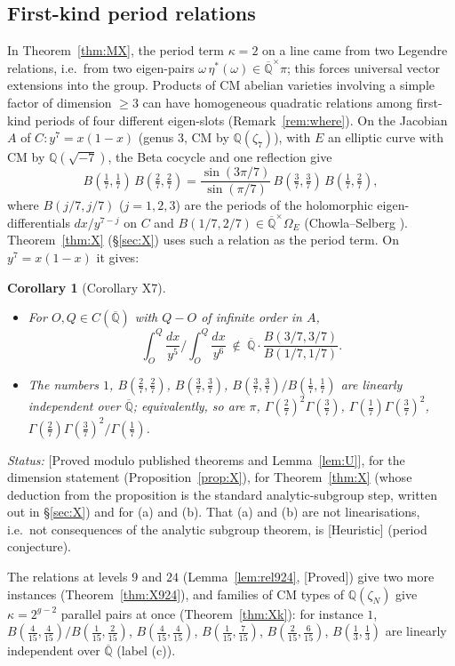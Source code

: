 \documentclass[11pt]{amsart}
\newtheorem{corollary}[theorem]{Corollary}
\theoremstyle{definition}
\newcommand{\Qb}{\overline{\mathbb{Q}}}
\newcommand{\Q}{\mathbb{Q}}
\newcommand{\lab}[1]{\textup{[#1]}}
\newcommand{\LabC}{\lab{Proved modulo published theorems and Lemma~\ref{lem:U}}}
\newcommand{\Status}{\noindent\emph{Status:} }
\begin{document}
\subsection*{First-kind period relations}
In Theorem~\ref{thm:MX}, the period term $\kappa=2$ on a line came from two Legendre relations, i.e.\ from two
eigen-pairs $\omega\,\eta^*(\omega)\in\Qb^\times\pi$; this forces universal vector extensions into the group. Products of
CM abelian varieties involving a simple factor of dimension $\ge3$ can have homogeneous quadratic relations among
first-kind periods of four different eigen-slots (Remark~\ref{rem:where}). On the Jacobian $A$ of $C\colon y^7=x(1-x)$ (genus $3$, CM by $\Q(\zeta_7)$), with $E$ an elliptic curve
with CM by $\Q(\sqrt{-7})$, the Beta cocycle and one reflection give
\[
B(\tfrac17,\tfrac17)\,B(\tfrac27,\tfrac27)=\frac{\sin(3\pi/7)}{\sin(\pi/7)}\,B(\tfrac37,\tfrac37)\,B(\tfrac17,\tfrac27),
\]
where $B(j/7,j/7)$ ($j=1,2,3$) are the periods of the holomorphic eigen-differentials $dx/y^{7-j}$ on $C$ and
$B(1/7,2/7)\in\Qb^\times\Omega_E$ (Chowla--Selberg \cite{Gr78}). Theorem~\ref{thm:X} (\S\ref{sec:X}) uses such a relation as the
period term. On $y^7=x(1-x)$ it gives:

\begin{corollary}[Corollary X7]\label{cor:X7intro}
\begin{itemize}
\item[(a)] For $O,Q\in C(\Qb)$ with $Q-O$ of infinite order in $A$,
\[
\int_O^Q\frac{dx}{y^5}\Big/\int_O^Q\frac{dx}{y^6}\ \notin\ \Qb\cdot\frac{B(3/7,3/7)}{B(1/7,1/7)} .
\]
\item[(b)] The numbers $1$, $B(\tfrac27,\tfrac27)$, $B(\tfrac37,\tfrac37)$, $B(\tfrac37,\tfrac37)/B(\tfrac17,\tfrac17)$
are linearly independent over $\Qb$; equivalently, so are $\pi$, $\Gamma(\tfrac27)^2\Gamma(\tfrac37)$,
$\Gamma(\tfrac17)\Gamma(\tfrac37)^2$, $\Gamma(\tfrac27)\Gamma(\tfrac37)^2/\Gamma(\tfrac17)$.
\end{itemize}
\end{corollary}

\Status \LabC, for the dimension statement
(Proposition~\ref{prop:X}), for Theorem~\ref{thm:X} (whose deduction from the proposition is the standard
analytic-subgroup step, written out in \S\ref{sec:X}) and for (a) and (b). That (a) and (b) are not linearisations,
i.e.\ not consequences of the analytic subgroup theorem, is \lab{Heuristic} (period conjecture).

The relations at levels $9$ and $24$ (Lemma~\ref{lem:rel924}, \lab{Proved}) give two more instances
(Theorem~\ref{thm:X924}), and families of CM types of $\Q(\zeta_N)$ give $\kappa=2^{g-2}$ parallel pairs at once
(Theorem~\ref{thm:Xk}): for instance $1$, $B(\frac4{15},\frac4{15})/B(\frac1{15},\frac2{15})$, $B(\frac4{15},\frac4{15})$,
$B(\frac1{15},\frac7{15})$, $B(\frac2{15},\frac6{15})$, $B(\frac13,\frac13)$ are linearly independent over $\Qb$ (label (c)).
\end{document}
